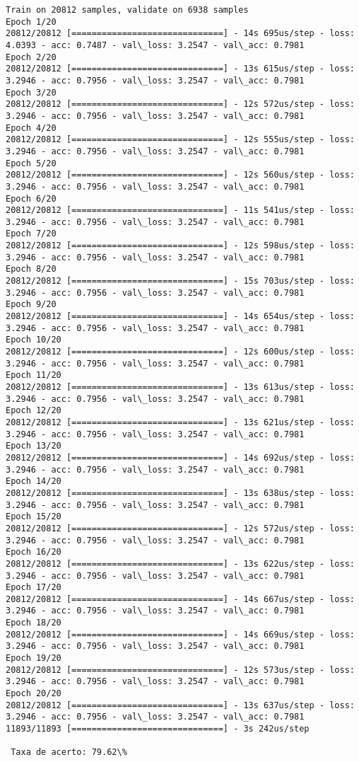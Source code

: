 \documentclass[11pt]{article}
\begin{document}
    \begin{Verbatim}[commandchars=\\\{\}]
Train on 20812 samples, validate on 6938 samples
Epoch 1/20
20812/20812 [==============================] - 14s 695us/step - loss: 4.0393 - acc: 0.7487 - val\_loss: 3.2547 - val\_acc: 0.7981
Epoch 2/20
20812/20812 [==============================] - 13s 615us/step - loss: 3.2946 - acc: 0.7956 - val\_loss: 3.2547 - val\_acc: 0.7981
Epoch 3/20
20812/20812 [==============================] - 12s 572us/step - loss: 3.2946 - acc: 0.7956 - val\_loss: 3.2547 - val\_acc: 0.7981
Epoch 4/20
20812/20812 [==============================] - 12s 555us/step - loss: 3.2946 - acc: 0.7956 - val\_loss: 3.2547 - val\_acc: 0.7981
Epoch 5/20
20812/20812 [==============================] - 12s 560us/step - loss: 3.2946 - acc: 0.7956 - val\_loss: 3.2547 - val\_acc: 0.7981
Epoch 6/20
20812/20812 [==============================] - 11s 541us/step - loss: 3.2946 - acc: 0.7956 - val\_loss: 3.2547 - val\_acc: 0.7981
Epoch 7/20
20812/20812 [==============================] - 12s 598us/step - loss: 3.2946 - acc: 0.7956 - val\_loss: 3.2547 - val\_acc: 0.7981
Epoch 8/20
20812/20812 [==============================] - 15s 703us/step - loss: 3.2946 - acc: 0.7956 - val\_loss: 3.2547 - val\_acc: 0.7981
Epoch 9/20
20812/20812 [==============================] - 14s 654us/step - loss: 3.2946 - acc: 0.7956 - val\_loss: 3.2547 - val\_acc: 0.7981
Epoch 10/20
20812/20812 [==============================] - 12s 600us/step - loss: 3.2946 - acc: 0.7956 - val\_loss: 3.2547 - val\_acc: 0.7981
Epoch 11/20
20812/20812 [==============================] - 13s 613us/step - loss: 3.2946 - acc: 0.7956 - val\_loss: 3.2547 - val\_acc: 0.7981
Epoch 12/20
20812/20812 [==============================] - 13s 621us/step - loss: 3.2946 - acc: 0.7956 - val\_loss: 3.2547 - val\_acc: 0.7981
Epoch 13/20
20812/20812 [==============================] - 14s 692us/step - loss: 3.2946 - acc: 0.7956 - val\_loss: 3.2547 - val\_acc: 0.7981
Epoch 14/20
20812/20812 [==============================] - 13s 638us/step - loss: 3.2946 - acc: 0.7956 - val\_loss: 3.2547 - val\_acc: 0.7981
Epoch 15/20
20812/20812 [==============================] - 12s 572us/step - loss: 3.2946 - acc: 0.7956 - val\_loss: 3.2547 - val\_acc: 0.7981
Epoch 16/20
20812/20812 [==============================] - 13s 622us/step - loss: 3.2946 - acc: 0.7956 - val\_loss: 3.2547 - val\_acc: 0.7981
Epoch 17/20
20812/20812 [==============================] - 14s 667us/step - loss: 3.2946 - acc: 0.7956 - val\_loss: 3.2547 - val\_acc: 0.7981
Epoch 18/20
20812/20812 [==============================] - 14s 669us/step - loss: 3.2946 - acc: 0.7956 - val\_loss: 3.2547 - val\_acc: 0.7981
Epoch 19/20
20812/20812 [==============================] - 12s 573us/step - loss: 3.2946 - acc: 0.7956 - val\_loss: 3.2547 - val\_acc: 0.7981
Epoch 20/20
20812/20812 [==============================] - 13s 637us/step - loss: 3.2946 - acc: 0.7956 - val\_loss: 3.2547 - val\_acc: 0.7981
11893/11893 [==============================] - 3s 242us/step

 Taxa de acerto: 79.62\%

    \end{Verbatim}
\end{document}

